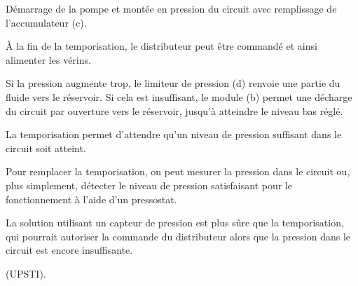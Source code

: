 \ifprof
\begin{corrige}
Démarrage de la pompe et montée en pression du circuit avec remplissage de l’accumulateur (c).

À la fin de la temporisation, le distributeur peut être commandé et ainsi alimenter les vérins.

Si la pression augmente trop, le limiteur de pression (d) renvoie une partie du fluide vers le
réservoir. Si cela est insuffisant, le module (b) permet une décharge du circuit par ouverture vers le réservoir,
jusqu’à atteindre le niveau bas réglé.

La temporisation permet d’attendre qu’un niveau de pression suffisant dans le circuit soit atteint.

Pour remplacer la temporisation, on peut mesurer la pression dans le circuit ou, plus simplement, détecter
le niveau de pression satisfaisant pour le fonctionnement à l’aide d’un pressostat.

La solution utilisant un capteur de pression est plus sûre que la temporisation, qui pourrait autoriser la
commande du distributeur alors que la pression dans le circuit est encore insuffisante.

(UPSTI).
\end{corrige}
\else
\fi

\ifprof
\else
{}
\fi

